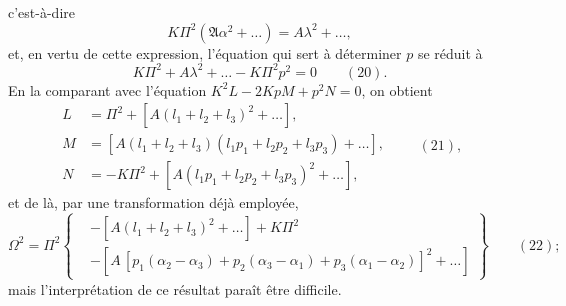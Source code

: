 \documentclass[11pt]{article}
\begin{document}
\noindent c'est-\`a-dire
\[
K\Pi^{2}(\mathfrak{A}\alpha^{2} + \dots) = A\lambda^{2} + \dots,
\]
et, en vertu de cette expression, l'\'equation qui sert \`a d\'eterminer $p$ se r\'eduit \`a
\[
K\Pi^{2} + A\lambda^{2} + \dots - K\Pi^{2} p^{2} = 0 \qquad (20).
\]
En la comparant avec l'\'equation $K^{2}L - 2KpM + p^{2}N = 0$, on obtient
\[
\begin{aligned}
L &= \Pi^{2} + [A(l_{1} + l_{2} + l_{3})^{2} + \dots],\\
M &= [A(l_{1} + l_{2} + l_{3})(l_{1}p_{1} + l_{2}p_{2} + l_{3}p_{3}) + \dots],\\
N &= -K\Pi^{2} + [A(l_{1}p_{1} + l_{2}p_{2} + l_{3}p_{3})^{2} + \dots],
\end{aligned}\qquad (21),
\]
et de l\`a, par une transformation d\'ej\`a employ\'ee,
\[
\Omega^{2} = \Pi^{2}\left\{\begin{aligned}
&-[A(l_{1} + l_{2} + l_{3})^{2} + \dots] + K\Pi^{2}\\
&-[A\,[p_{1}(\alpha_{2} - \alpha_{3}) + p_{2}(\alpha_{3} - \alpha_{1}) + p_{3}(\alpha_{1} - \alpha_{2})]^{2} + \dots]
\end{aligned}\right\}\qquad (22);
\]
mais l'interpr\'etation de ce r\'esultat para\^it \^etre difficile.
\end{document}
